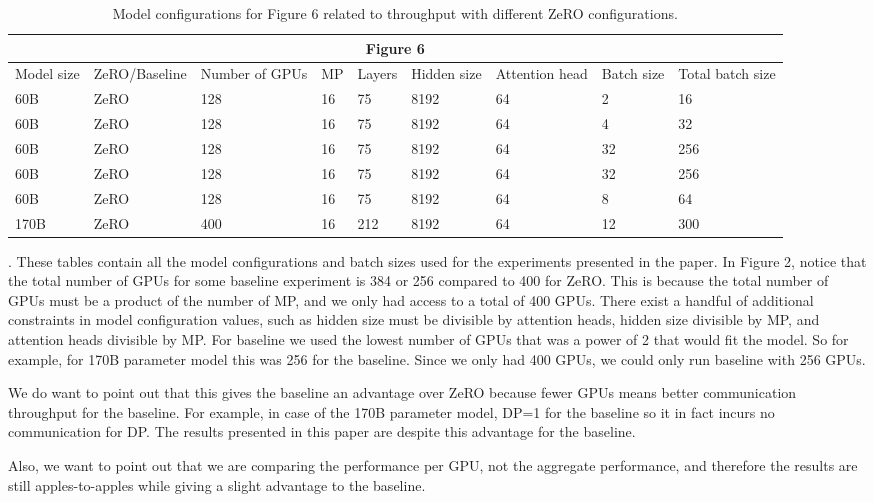 \begin{table}[t!]
\scriptsize
\begin{tabular}{|l|l|l|l|l|l|l|l|l|}
\hline
\multicolumn{9}{|c|}{Figure 6} \\ \hline
Model size & ZeRO/Baseline & Number of GPUs & MP & Layers & Hidden size & Attention head & Batch size & Total batch size \\ \hline
60B & ZeRO & 128 & 16 & 75 & 8192 & 64 & 2 & 16 \\ \hline
60B & ZeRO & 128 & 16 & 75 & 8192 & 64 & 4 & 32 \\ \hline
60B & ZeRO & 128 & 16 & 75 & 8192 & 64 & 32 & 256 \\ \hline
60B & ZeRO & 128 & 16 & 75 & 8192 & 64 & 32 & 256 \\ \hline
60B & ZeRO & 128 & 16 & 75 & 8192 & 64 & 8 & 64 \\ \hline
170B & ZeRO & 400 & 16 & 212 & 8192 & 64 & 12 & 300 \\ \hline
\end{tabular}
\caption{Model configurations for Figure 6 related to throughput with different ZeRO configurations.}
\end{table}
.
\newpage
These tables contain all the model configurations and batch sizes used for the experiments presented in the paper. In Figure 2, notice that the total number of GPUs for some baseline experiment is 384 or 256 compared to 400 for ZeRO. This is because the total number of GPUs must be a product of the number of MP, and we only had access to a total of 400 GPUs. There exist a handful of additional constraints in model configuration values, such as hidden size must be divisible by attention heads, hidden size divisible by MP, and attention heads divisible by MP. For baseline we used the lowest number of GPUs that was a power of 2 that would fit the model. So for example, for 170B parameter model this was 256 for the baseline. Since we only had 400 GPUs, we could only run baseline with 256 GPUs. 

We do want to point out that this gives the baseline an advantage over ZeRO because fewer GPUs means better communication throughput for the baseline. For example, in case of the 170B parameter model, DP=1 for the baseline so it in fact incurs no communication for DP. The results presented in this paper are despite this advantage for the baseline.

Also, we want to point out that we are comparing the performance per GPU, not the aggregate performance, and therefore the results are still apples-to-apples while giving a slight advantage to the baseline.




